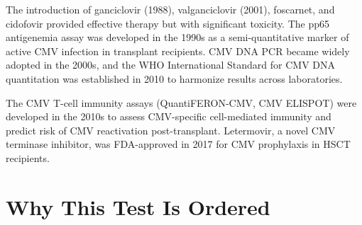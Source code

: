 The introduction of ganciclovir (1988), valganciclovir (2001), foscarnet, and cidofovir provided effective therapy but with significant toxicity. The pp65 antigenemia assay was developed in the 1990s as a semi-quantitative marker of active CMV infection in transplant recipients. CMV DNA PCR became widely adopted in the 2000s, and the WHO International Standard for CMV DNA quantitation was established in 2010 to harmonize results across laboratories.

The CMV T-cell immunity assays (QuantiFERON-CMV, CMV ELISPOT) were developed in the 2010s to assess CMV-specific cell-mediated immunity and predict risk of CMV reactivation post-transplant. Letermovir, a novel CMV terminase inhibitor, was FDA-approved in 2017 for CMV prophylaxis in HSCT recipients.

\section*{Why This Test Is Ordered}
